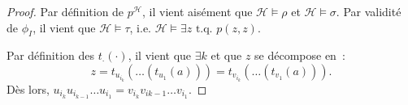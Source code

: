 \documentclass{article}
\theoremstyle{definition}
\theoremstyle{remark}
\newcommand{\tq}{\text{ t.q. }}
\begin{document}
\begin{proof}
		Par définition de $p^{\mathcal H}$, il vient aisément que $\mathcal H \models \rho$ et $\mathcal H \models \sigma$. Par validité de $\phi_I$, il vient
		que $\mathcal H \models \tau$, i.e. $\mathcal H \models \exists z \tq p(z, z)$.

		Par définition des $t_{\cdot}(\cdot)$, il vient que $\exists k$ et que $z$ se décompose en~:
		\[z = t_{u_{i_k}}(\ldots(t_{u_1}(a))) = t_{v_{i_k}}(\ldots(t_{v_1}(a))).\]
		Dès lors, $u_{i_k}u_{i_{k-1}}\ldots u_{i_1} = v_{i_k}v_{i{k-1}}\ldots v_{i_1}.$
		\end{proof}
\end{document}
